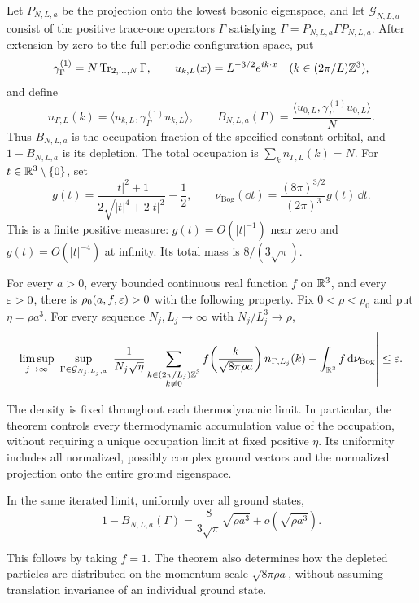 Let $P_{N,L,a}$ be the projection onto the lowest bosonic eigenspace,
and let $\mathcal G_{N,L,a}$ consist of the positive trace-one operators
$\Gamma$ satisfying $\Gamma=P_{N,L,a}\Gamma P_{N,L,a}$. After extension
by zero to the full periodic configuration space, put
\[
 \gamma^{(1)}_\Gamma=N\operatorname{Tr}_{2,\ldots,N}\Gamma,
 \qquad u_{k,L}(x)=L^{-3/2}e^{ik\cdot x}\quad
                    (k\in(2\pi/L)\mathbb Z^3),
\]
and define
\[
 n_{\Gamma,L}(k)=\langle u_{k,L},\gamma^{(1)}_\Gamma u_{k,L}\rangle,
 \qquad
 B_{N,L,a}(\Gamma)=\frac{\langle u_{0,L},\gamma^{(1)}_\Gamma u_{0,L}\rangle}{N}.
\]
Thus $B_{N,L,a}$ is the occupation fraction of the specified constant
orbital, and $1-B_{N,L,a}$ is its depletion.
The total occupation is $\sum_k n_{\Gamma,L}(k)=N$.
For $t\in\mathbb R^3\setminus\{0\}$, set
\begin{equation}\label{intro:profile}
 g(t)=\frac{|t|^2+1}{2\sqrt{|t|^4+2|t|^2}}-\frac12,
 \qquad
 \nu_{\mathrm{Bog}}(\dd t)
       =\frac{(8\pi)^{3/2}}{(2\pi)^3}g(t)\,\dd t.
\end{equation}
This is a finite positive measure: $g(t)=O(|t|^{-1})$ near zero
and $g(t)=O(|t|^{-4})$ at infinity. Its total mass is $8/(3\sqrt\pi)$.

\begin{theorem}\label{thm:main}
For every $a>0$, every bounded continuous real function $f$ on $\mathbb R^3$,
and every $\varepsilon>0$, there is $\rho_0(a,f,\varepsilon)>0$ with the following
property. Fix $0<\rho<\rho_0$ and put $\eta=\rho a^3$. For every
sequence $N_j,L_j\longrightarrow\infty$ with
$N_j/L_j^3\longrightarrow\rho$,
\begin{equation}\label{intro:main-limit}
 \limsup_{j\to\infty}\ \sup_{\Gamma\in\mathcal G_{N_j,L_j,a}}
 \left|
 \frac{1}{N_j\sqrt\eta}
 \sum_{\substack{k\in(2\pi/L_j)\mathbb Z^3\\k\ne0}}
 f\!\left(\frac{k}{\sqrt{8\pi\rho a}}\right)n_{\Gamma,L_j}(k)
       -\int_{\mathbb R^3}f\,\mathrm d\nu_{\mathrm{Bog}}
 \right|\le\varepsilon.
\end{equation}
\end{theorem}

The density is fixed throughout each thermodynamic limit. In particular,
the theorem controls every thermodynamic accumulation value of the
occupation, without requiring a unique occupation limit at fixed
positive $\eta$. Its uniformity includes all normalized, possibly
complex ground vectors and the normalized projection onto the entire
ground eigenspace.

\begin{corollary}\label{cor:depletion}
In the same iterated limit, uniformly over all ground states,
\[
 1-B_{N,L,a}(\Gamma)
   =\frac8{3\sqrt\pi}\sqrt{\rho a^3}+o(\sqrt{\rho a^3}).
\]
\end{corollary}
This follows by taking $f=1$. The theorem also determines how the
depleted particles are distributed on the momentum scale
$\sqrt{8\pi\rho a}$, without assuming translation invariance of an
individual ground state.

